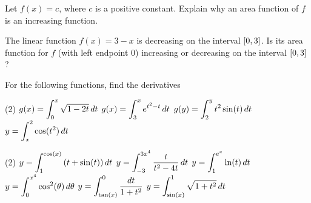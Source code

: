 \documentclass[answers]{exam}
\begin{document}
\begin{ex*}
  Let $f(x)=c$, where $c$ is a positive constant. Explain why an area function of $f$ is an increasing function.
\end{ex*}

\begin{ex*}
  The linear function $f(x)=3-x$ is decreasing on the interval ${\left[0,3\right]}$. Is its area function for $f$ (with left endpoint 0) increasing or decreasing on the interval ${\left[0,3\right]}$?
\end{ex*}
\pagebreak

\noindent
{}

\begin{ex*}
  For the following functions, find the derivatives
\end{ex*}
\begin{tasks}[after-item-skip=\stretch{1}](2)
  \task $g(x)=\displaystyle\int_0^x \sqrt{1-2t}\,dt$
  \task $g(x)=\displaystyle\int_3^x e^{t^2-t}\,dt$
  \task $g(y)=\displaystyle\int_2^y t^2\sin(t)\,dt$
  \task $y=\displaystyle\int_x^2 \cos(t^2)\,dt$
\end{tasks}
\pagebreak

\begin{tasks}[after-item-skip=\stretch{1}, resume](2)
  \task $y=\displaystyle\int_1^{\cos(x)} {\left(t+\sin(t)\right)}\,dt$
  \task $y=\displaystyle\int_{-3}^{3x^4} \frac{t}{t^2-4t}\,dt$
  \task $y=\displaystyle\int_1^{e^x} \ln(t)\,dt$
  \task $y=\displaystyle\int_0^{x^4} \cos^2(\theta)\,d\theta$
  \task $y=\displaystyle\int_{\tan(x)}^0 \frac{dt}{1+t^2}$
  \task $y=\displaystyle\int_{\sin(x)}^1 \sqrt{1+t^2}\,dt$
\end{tasks}
\pagebreak

\noindent
{}
\end{document}
